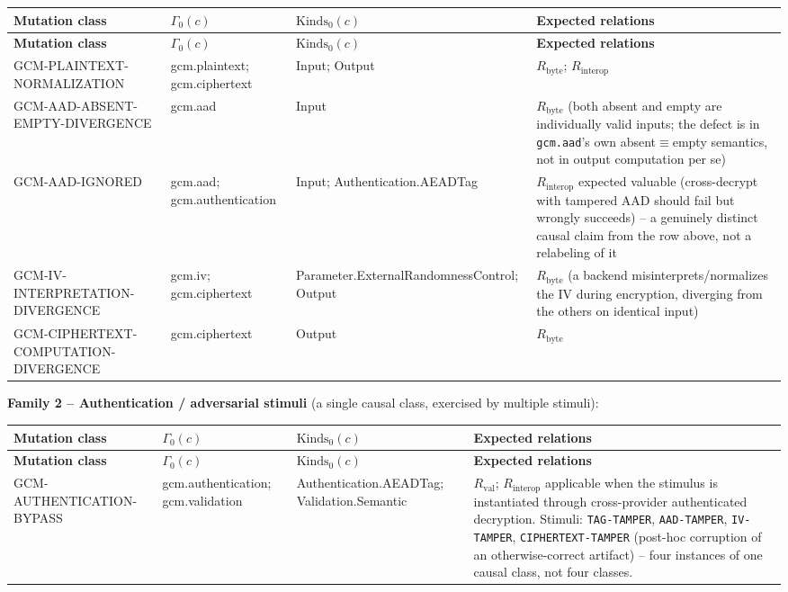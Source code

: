 \documentclass[11pt,a4paper]{article}
\begin{document}
\begin{longtable}{@{}L{0.23\textwidth}L{0.25\textwidth}L{0.27\textwidth}L{0.17\textwidth}@{}}
\toprule
\textbf{Mutation class} & \textbf{$\Gamma_0(c)$} & \textbf{$\text{Kinds}_0(c)$} & \textbf{Expected relations}\\
\midrule\endfirsthead
\toprule
\textbf{Mutation class} & \textbf{$\Gamma_0(c)$} & \textbf{$\text{Kinds}_0(c)$} & \textbf{Expected relations}\\
\midrule\endhead
GCM-PLAINTEXT-NORMALIZATION & gcm.plaintext; gcm.ciphertext & Input; Output & $R_{\text{byte}}$; $R_{\text{interop}}$\\
GCM-AAD-ABSENT-EMPTY-DIVERGENCE & gcm.aad & Input & $R_{\text{byte}}$ (both absent and empty are individually valid inputs; the defect is in \texttt{gcm.aad}'s own absent$\equiv$empty semantics, not in output computation per se)\\
GCM-AAD-IGNORED & gcm.aad; gcm.authentication & Input; Authentication.AEADTag & $R_{\text{interop}}$ expected valuable (cross-decrypt with tampered AAD should fail but wrongly succeeds) -- a genuinely distinct causal claim from the row above, not a relabeling of it\\
GCM-IV-INTERPRETATION-DIVERGENCE & gcm.iv; gcm.ciphertext & Parameter.External\allowbreak Randomness\allowbreak Control; Output & $R_{\text{byte}}$ (a backend misinterprets/normalizes the IV during encryption, diverging from the others on identical input)\\
GCM-CIPHERTEXT-COMPUTATION-DIVERGENCE & gcm.ciphertext & Output & $R_{\text{byte}}$\\
\bottomrule
\end{longtable}

\textbf{Family 2 -- Authentication / adversarial stimuli} (a single causal class, exercised by multiple stimuli):

\begin{longtable}{@{}L{0.23\textwidth}L{0.25\textwidth}L{0.27\textwidth}L{0.17\textwidth}@{}}
\toprule
\textbf{Mutation class} & \textbf{$\Gamma_0(c)$} & \textbf{$\text{Kinds}_0(c)$} & \textbf{Expected relations}\\
\midrule\endfirsthead
\toprule
\textbf{Mutation class} & \textbf{$\Gamma_0(c)$} & \textbf{$\text{Kinds}_0(c)$} & \textbf{Expected relations}\\
\midrule\endhead
GCM-AUTHENTICATION-\allowbreak BYPASS & gcm.authentication; gcm.validation & Authentication.AEADTag; Validation.Semantic & $R_{\text{val}}$; $R_{\text{interop}}$ applicable when the stimulus is instantiated through cross-provider authenticated decryption. Stimuli: \texttt{TAG-TAMPER}, \texttt{AAD-TAMPER}, \texttt{IV-TAMPER}, \texttt{CIPHERTEXT-\allowbreak TAMPER} (post-hoc corruption of an otherwise-correct artifact) -- four instances of one causal class, not four classes.\\
\bottomrule
\end{longtable}
\end{document}
